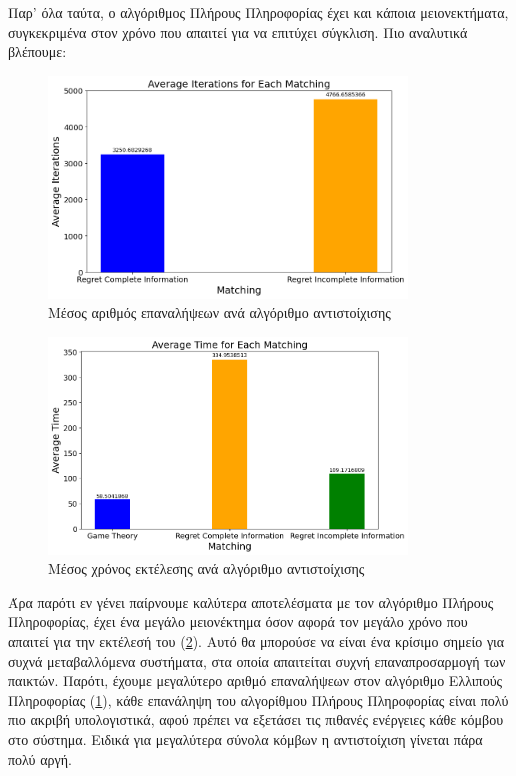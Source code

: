 Παρ' όλα ταύτα, ο αλγόριθμος Πλήρους Πληροφορίας έχει και κάποια μειονεκτήματα, συγκεκριμένα στον χρόνο που απαιτεί για να επιτύχει σύγκλιση. Πιο αναλυτικά βλέπουμε:

\begin{figure}[H]
    \centering
    \includegraphics[width=0.85\textwidth]{figures/chapter4/Average_Iterations.png}
    \caption{Μέσος αριθμός επαναλήψεων ανά αλγόριθμο αντιστοίχισης}
    \label{fig29}
\end{figure}

\begin{figure}[H]
    \centering
    \includegraphics[width=0.85\textwidth]{figures/chapter4/Average_Time.png}
    \caption{Μέσος χρόνος εκτέλεσης ανά αλγόριθμο αντιστοίχισης}
    \label{fig30}
\end{figure}

Άρα παρότι εν γένει παίρνουμε καλύτερα αποτελέσματα με τον αλγόριθμο Πλήρους Πληροφορίας, έχει ένα μεγάλο μειονέκτημα όσον αφορά τον μεγάλο χρόνο που απαιτεί για την εκτέλεσή του (\ref{fig30}). Αυτό θα μπορούσε να είναι ένα κρίσιμο σημείο για συχνά μεταβαλλόμενα συστήματα, στα οποία απαιτείται συχνή επαναπροσαρμογή των παικτών. Παρότι, έχουμε μεγαλύτερο αριθμό επαναλήψεων στον αλγόριθμο Ελλιπούς Πληροφορίας (\ref{fig29}), κάθε επανάληψη του αλγορίθμου Πλήρους Πληροφορίας είναι πολύ πιο ακριβή υπολογιστικά, αφού πρέπει να εξετάσει τις πιθανές ενέργειες κάθε κόμβου στο σύστημα. Ειδικά για μεγαλύτερα σύνολα κόμβων η αντιστοίχιση γίνεται πάρα πολύ αργή.

